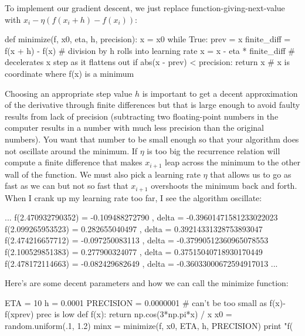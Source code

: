 \documentclass[titlepage]{tufte-book}
\begin{document}
\begin{fullwidth}
\vspace{3mm}
\noindent To implement our gradient descent, we just replace function-giving-next-value with $x_i - \eta (f(x_{i}+h) - f(x_{i}))$:

\begin{pyverbatim}
def minimize(f, x0, eta, h, precision):
    x = x0
    while True:
        prev = x
        finite_diff = f(x + h) - f(x)	 # division by h rolls into learning rate
        x = x - eta * finite_diff 		# decelerates x step as it flattens out
        if abs(x - prev) < precision:
            return x   # x is coordinate where f(x) is a minimum
\end{pyverbatim}

Choosing an appropriate step value $h$ is important to get a decent approximation of the derivative through finite differences but that is large enough to avoid faulty results from lack of precision (subtracting two floating-point numbers in the computer results in a number with much less precision than the original numbers). You want that number to be small enough so that your algorithm does not oscillate around the minimum. If $\eta$ is too big the recurrence relation will compute a finite difference that makes $x_{i+1}$ leap across the minimum to the other wall of the function.  We must also pick a learning rate $\eta$ that allows us to go as fast as we can but not so fast that $x_{i+1}$ overshoots the minimum back and forth. When I crank up my learning rate too far, I see the algorithm oscillate:

\begin{pyverbatim}
...
f(2.470932790352) = -0.109488272790 , delta = -0.39601471581233022023
f(2.099265953523) = 0.282655040497 , delta = 0.39214331328753893047
f(2.474216657712) = -0.097250083113 , delta = -0.37990512360965078553
f(2.100529851383) = 0.277900324077 , delta = 0.37515040718930170449
f(2.478172114663) = -0.082429682649 , delta = -0.36033000672594917013
...
\end{pyverbatim}

\noindent Here's are some decent parameters and how we can call the minimize function:

\begin{pyverbatim}
ETA = 10
h = 0.0001
PRECISION = 0.0000001 # can't be too small as f(x)-f(xprev) prec is low
def f(x): return np.cos(3*np.pi*x) / x
x0 = random.uniform(.1, 1.2)
minx = minimize(f, x0, ETA, h, PRECISION)
print "f(%
\end{pyverbatim}


\end{fullwidth}
\end{document}

